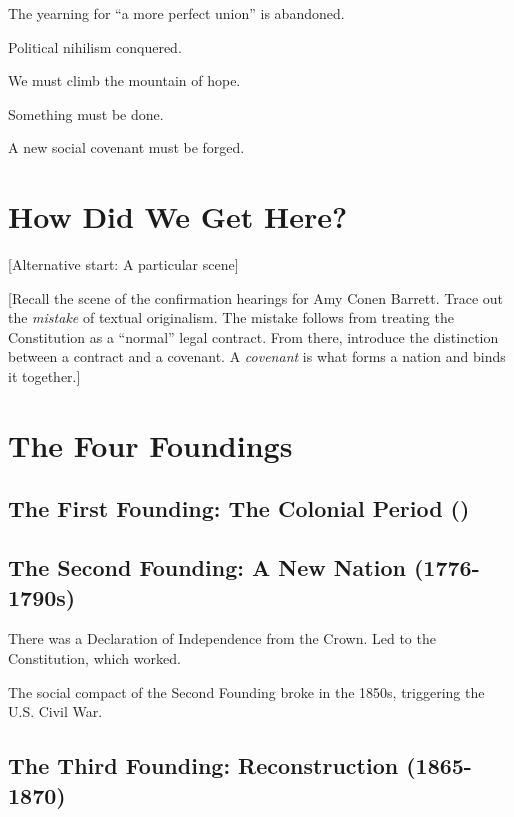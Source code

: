 \documentclass[
]{book}
\begin{document}
The yearning for ``a more perfect union'' is abandoned.

Political nihilism conquered.

We must climb the mountain of hope.

Something must be done.

A new social covenant must be forged.

\hypertarget{how-did-we-get-here}{%
\section{How Did We Get Here?}\label{how-did-we-get-here}}

{[}Alternative start: A particular scene{]}

{[}Recall the scene of the confirmation hearings for Amy Conen Barrett. Trace out the \emph{mistake} of textual originalism. The mistake follows from treating the Constitution as a ``normal'' legal contract. From there, introduce the distinction between a contract and a covenant. A \emph{covenant} is what forms a nation and binds it together.{]}

\hypertarget{the-four-foundings}{%
\section{The Four Foundings}\label{the-four-foundings}}

\hypertarget{the-first-founding-the-colonial-period}{%
\subsection{The First Founding: The Colonial Period ()}\label{the-first-founding-the-colonial-period}}

\hypertarget{the-second-founding-a-new-nation-1776-1790s}{%
\subsection{The Second Founding: A New Nation (1776-1790s)}\label{the-second-founding-a-new-nation-1776-1790s}}

There was a Declaration of Independence from the Crown. Led to the Constitution, which worked.

The social compact of the Second Founding broke in the 1850s, triggering the U.S. Civil War.

\hypertarget{the-third-founding-reconstruction-1865-1870}{%
\subsection{The Third Founding: Reconstruction (1865-1870)}\label{the-third-founding-reconstruction-1865-1870}}
\end{document}
